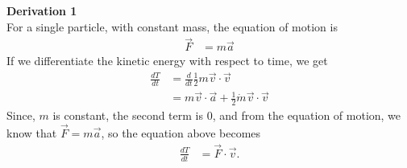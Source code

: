 \documentclass[10pt]{article}
\begin{document}
\textbf{Derivation 1}\\
For a single particle, with constant mass, the equation of motion is
\begin{align*}
  \vec F &= m\vec a
\end{align*}
If we differentiate the kinetic energy with respect to time, we get
\begin{align*}
  \frac{d T}{d t} &= \frac{d}{d t}\frac{1}{2}m\vec v\cdot\vec v\\
  &= m\vec v\cdot\vec a+\frac{1}{2}\dot m\vec v\cdot\vec v
\end{align*}
Since, $m$ is constant, the second term is 0, and from the equation of motion, 
we know that $\vec F=m\vec a$, so the equation above becomes
\begin{align*}
  \frac{dT}{dt} &= \vec F\cdot\vec v.
\end{align*}
\end{document}
